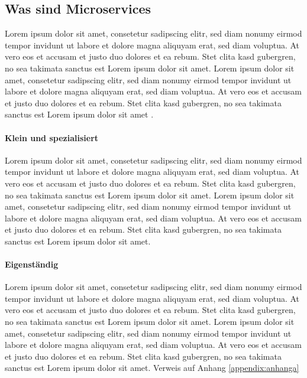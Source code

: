 	\subsection{Was sind Microservices}
	Lorem ipsum dolor sit amet, consetetur sadipscing elitr, sed diam nonumy eirmod tempor invidunt ut labore et dolore magna aliquyam erat, sed diam voluptua. At vero eos et accusam et justo duo dolores et ea rebum. Stet clita kasd gubergren, no sea takimata sanctus est Lorem ipsum dolor sit amet. Lorem ipsum dolor sit amet, consetetur sadipscing elitr, sed diam nonumy eirmod tempor invidunt ut labore et dolore magna aliquyam erat, sed diam voluptua. At vero eos et accusam et justo duo dolores et ea rebum. Stet clita kasd gubergren, no sea takimata sanctus est Lorem ipsum dolor sit amet \cite{Reese2009}.
	
	\paragraph{Klein und spezialisiert} Lorem ipsum dolor sit amet, consetetur sadipscing elitr, sed diam nonumy eirmod tempor invidunt ut labore et dolore magna aliquyam erat, sed diam voluptua. At vero eos et accusam et justo duo dolores et ea rebum. Stet clita kasd gubergren, no sea takimata sanctus est Lorem ipsum dolor sit amet. Lorem ipsum dolor sit amet, consetetur sadipscing elitr, sed diam nonumy eirmod tempor invidunt ut labore et dolore magna aliquyam erat, sed diam voluptua. At vero eos et accusam et justo duo dolores et ea rebum. Stet clita kasd gubergren, no sea takimata sanctus est Lorem ipsum dolor sit amet.
	
	\paragraph{Eigenständig} Lorem ipsum dolor sit amet, consetetur sadipscing elitr, sed diam nonumy eirmod tempor invidunt ut labore et dolore magna aliquyam erat, sed diam voluptua. At vero eos et accusam et justo duo dolores et ea rebum. Stet clita kasd gubergren, no sea takimata sanctus est Lorem ipsum dolor sit amet. Lorem ipsum dolor sit amet, consetetur sadipscing elitr, sed diam nonumy eirmod tempor invidunt ut labore et dolore magna aliquyam erat, sed diam voluptua. At vero eos et accusam et justo duo dolores et ea rebum. Stet clita kasd gubergren, no sea takimata sanctus est Lorem ipsum dolor sit amet. Verweis auf Anhang \ref{appendix:anhanga} 
